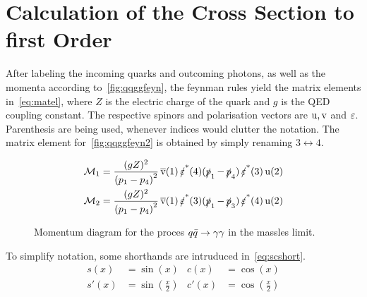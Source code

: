 
\section{Calculation of the Cross Section to first Order}%
\label{sec:qqggcalc}

After labeling the incoming quarks and outcoming photons, as well as
the momenta according to~\ref{fig:qqggfeyn}, the feynman rules yield
the matrix elements in~\eqref{eq:matel}, where \(Z\) is the electric
charge of the quark and \(g\) is the QED coupling constant. The
respective spinors and polarisation vectors are \(\operatorname{u},\operatorname{v}\) and
\(\operatorname{\varepsilon}\). Parenthesis are being used, whenever indices would clutter
the notation. The matrix element for~\ref{fig:qqggfeyn2} is obtained
by simply renaming \(3\leftrightarrow 4\).

\begin{align}
  \label{eq:matel}
  \mathcal{M}_1 &= \frac{(gZ)^2}{\qty(p_1 - p_4)^2}\vsb(1)\pses(4)(\ps_1 -
                \ps_4)\pses(3)\us(2)\\
  \mathcal{M}_2 &= \frac{(gZ)^2}{\qty(p_1 - p_4)^2}\vsb(1)\pses(3)(\ps_1 - \ps_3)\pses(4)\us(2)
\end{align}

\begin{wrapfigure}{R}{0.4\textwidth}
\centering
{}
\caption{\label{fig:qqimpulses} Momentum diagram for the proces
  \(q\bar{q}\rightarrow\gamma\gamma\) in the massles limit.}
\end{wrapfigure}


To simplify notation, some shorthands are intruduced
in~\eqref{eq:scshort}.
\begin{equation}
  \label{eq:scshort}
  \begin{split}
    s(x) &= \sin(x) & c(x) &= \cos(x) \\ s'(x) &= \sin(\frac{x}{2}) & c'(x) &= \cos(\frac{x}{2})
  \end{split}
\end{equation}


